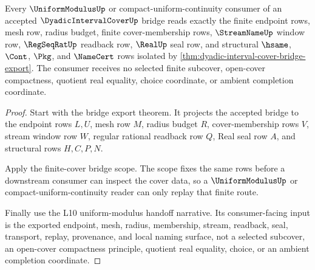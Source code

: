 \begin{theorem}
\label{thm:dyadic-interval-cover-uniform-modulus-bridge-consumer}
Every $\UniformModulusUp$ or compact-uniform-continuity consumer of an accepted $\DyadicIntervalCoverUp$ bridge reads exactly the finite endpoint rows, mesh row, radius budget, finite cover-membership rows, $\StreamNameUp$ window row, $\RegSeqRatUp$ readback row, $\RealUp$ seal row, and structural $\hsame$, $\Cont$, $\Pkg$, and $\NameCert$ rows isolated by \autoref{thm:dyadic-interval-cover-bridge-export}. The consumer receives no selected finite subcover, open-cover compactness, quotient real equality, choice coordinate, or ambient completion coordinate.
\end{theorem}
\begin{proof}
Start with the bridge export theorem. It projects the accepted bridge to the endpoint rows $L,U$, mesh row $M$, radius budget $R$, cover-membership rows $V$, stream window row $W$, regular rational readback row $Q$, Real seal row $A$, and structural rows $H,C,P,N$.

Apply the finite-cover bridge scope. The scope fixes the same rows before a downstream consumer can inspect the cover data, so a $\UniformModulusUp$ or compact-uniform-continuity reader can only replay that finite route.

Finally use the L10 uniform-modulus handoff narrative. Its consumer-facing input is the exported endpoint, mesh, radius, membership, stream, readback, seal, transport, replay, provenance, and local naming surface, not a selected subcover, an open-cover compactness principle, quotient real equality, choice, or an ambient completion coordinate.
\end{proof}

